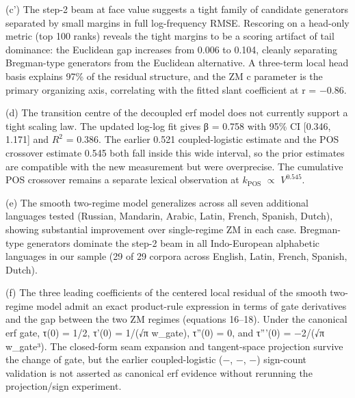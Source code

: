 \documentclass[11pt]{article}
\begin{document}
(c') The step-2 beam at face value suggests a tight family of candidate generators separated by small margins in full log-frequency RMSE. Rescoring on a head-only metric (top 100 ranks) reveals the tight margins to be a scoring artifact of tail dominance: the Euclidean gap increases from 0.006 to 0.104, cleanly separating Bregman-type generators from the Euclidean alternative. A three-term local head basis explains 97\% of the residual structure, and the ZM c parameter is the primary organizing axis, correlating with the fitted slant coefficient at r = −0.86.

(d) The transition centre of the decoupled erf model does not currently support a tight scaling law. The updated log-log fit gives β = 0.758 with 95\% CI [0.346, 1.171] and $R^2$ = 0.386. The earlier 0.521 coupled-logistic estimate and the POS crossover estimate 0.545 both fall inside this wide interval, so the prior estimates are compatible with the new measurement but were overprecise. The cumulative POS crossover remains a separate lexical observation at $k_{\mathrm{POS}}$ $\propto$ $V^{0.545}$.

(e) The smooth two-regime model generalizes across all seven additional languages tested (Russian, Mandarin, Arabic, Latin, French, Spanish, Dutch), showing substantial improvement over single-regime ZM in each case. Bregman-type generators dominate the step-2 beam in all Indo-European alphabetic languages in our sample (29 of 29 corpora across English, Latin, French, Spanish, Dutch).

(f) The three leading coefficients of the centered local residual of the smooth two-regime model admit an exact product-rule expression in terms of gate derivatives and the gap between the two ZM regimes (equations 16–18). Under the canonical erf gate, τ(0) = 1/2, τ'(0) = 1/(√π w\_gate), τ''(0) = 0, and τ'''(0) = −2/(√π w\_gate³). The closed-form seam expansion and tangent-space projection survive the change of gate, but the earlier coupled-logistic (−, −, −) sign-count validation is not asserted as canonical erf evidence without rerunning the projection/sign experiment.
\end{document}
